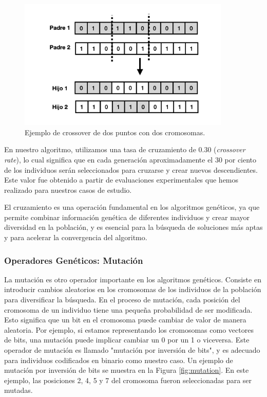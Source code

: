 \begin{figure}
  \centering
  \includegraphics[width=0.9\textwidth]{images/crossOver.png}
  \caption{Ejemplo de crossover de dos puntos con dos cromosomas.}
  \label{fig:crossover}
\end{figure}



En nuestro algoritmo, utilizamos una tasa de cruzamiento de 0.30 (\emph{crossover rate}), lo cual significa que en cada generación aproximadamente el 30 por ciento de los individuos serán seleccionados para cruzarse y crear nuevos descendientes. Este valor fue obtenido a partir de evaluaciones experimentales que hemos realizado para nuestros casos de estudio.

El cruzamiento es una operación fundamental en los algoritmos genéticos, ya que permite combinar información genética de diferentes individuos y crear mayor diversidad en la población, y es esencial para la búsqueda de soluciones más aptas y para acelerar la convergencia del algoritmo.

\subsubsection{Operadores Genéticos: Mutación}

La mutación es otro operador importante en los algoritmos genéticos. Consiste en introducir cambios aleatorios en los cromosomas de los individuos de la población para diversificar la búsqueda. En el proceso de mutación, cada posición del cromosoma de un individuo tiene una pequeña probabilidad de ser modificada. Esto significa que un bit en el cromosoma puede cambiar de valor de manera aleatoria. Por ejemplo, si estamos representando los cromosomas como vectores de bits, una mutación puede implicar cambiar un 0 por un 1 o viceversa. Este operador de mutación es llamado "mutación por inversión de bits", y es adecuado para individuos codificados en binario como nuestro caso. Un ejemplo de mutación por inversión de bits se muestra en la Figura \ref{fig:mutation}. En este ejemplo, las posiciones 2, 4, 5 y 7 del cromosoma fueron seleccionadas para ser mutadas. 

